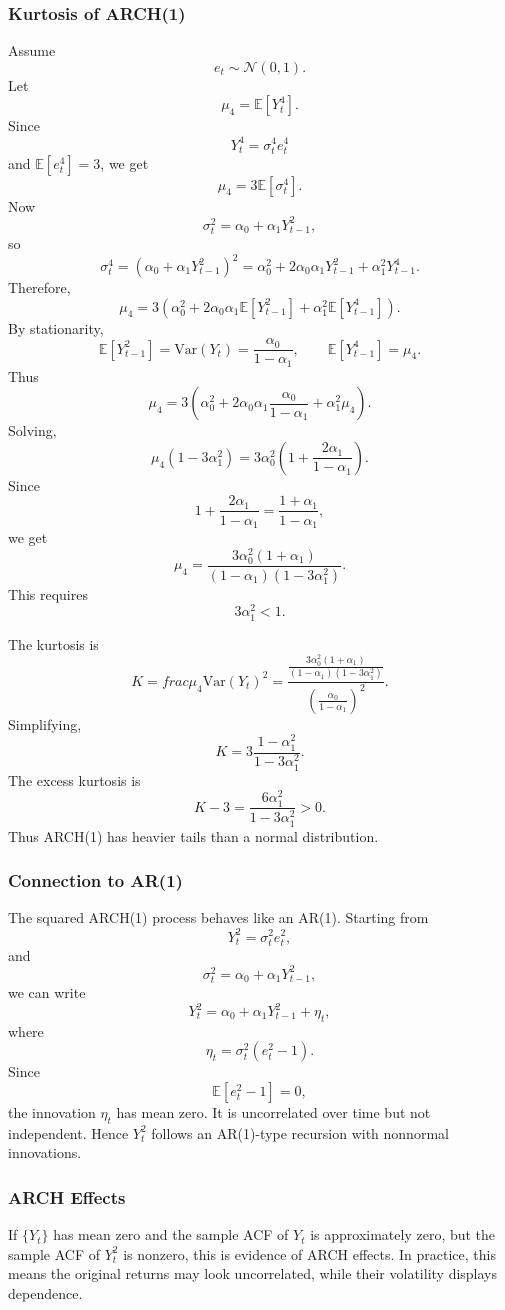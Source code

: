 \documentclass[12pt,oneside]{book}
\numberwithin{equation}{section}
\theoremstyle{definition}
\theoremstyle{plain}
\theoremstyle{remark}
\newcommand{\E}{\mathbb{E}}
\newcommand{\Var}{\mathrm{Var}}
\newcommand{\Normal}{\mathcal{N}}
\begin{document}
\subsubsection{Kurtosis of ARCH(1)}

Assume
\[
e_t\sim \Normal(0,1).
\]
Let
\[
\mu_4=\E[Y_t^4].
\]
Since
\[
Y_t^4=\sigma_t^4e_t^4
\]
and $\E[e_t^4]=3$, we get
\[
\mu_4=3\E[\sigma_t^4].
\]
Now
\[
\sigma_t^2=\alpha_0+\alpha_1Y_{t-1}^2,
\]
so
\[
\sigma_t^4
=
(\alpha_0+\alpha_1Y_{t-1}^2)^2
=
\alpha_0^2+2\alpha_0\alpha_1Y_{t-1}^2+\alpha_1^2Y_{t-1}^4.
\]
Therefore,
\[
\mu_4
=
3\left(
\alpha_0^2
+
2\alpha_0\alpha_1\E[Y_{t-1}^2]
+
\alpha_1^2\E[Y_{t-1}^4]
\right).
\]
By stationarity,
\[
\E[Y_{t-1}^2]=\Var(Y_t)=\frac{\alpha_0}{1-\alpha_1},
\qquad
\E[Y_{t-1}^4]=\mu_4.
\]
Thus
\[
\mu_4
=
3\left(
\alpha_0^2
+
2\alpha_0\alpha_1\frac{\alpha_0}{1-\alpha_1}
+
\alpha_1^2\mu_4
\right).
\]
Solving,
\[
\mu_4(1-3\alpha_1^2)
=
3\alpha_0^2
\left(
1+\frac{2\alpha_1}{1-\alpha_1}
\right).
\]
Since
\[
1+\frac{2\alpha_1}{1-\alpha_1}
=
\frac{1+\alpha_1}{1-\alpha_1},
\]
we get
\[
\mu_4
=
\frac{3\alpha_0^2(1+\alpha_1)}
{(1-\alpha_1)(1-3\alpha_1^2)}.
\]
This requires
\[
3\alpha_1^2<1.
\]

The kurtosis is
\[
K
=
frac{\mu_4}{\Var(Y_t)^2}
=
\frac{
\frac{3\alpha_0^2(1+\alpha_1)}
{(1-\alpha_1)(1-3\alpha_1^2)}
}{
\left(\frac{\alpha_0}{1-\alpha_1}\right)^2
}.
\]
Simplifying,
\[
K
=
3\frac{1-\alpha_1^2}{1-3\alpha_1^2}.
\]
The excess kurtosis is
\[
K-3
=
\frac{6\alpha_1^2}{1-3\alpha_1^2}>0.
\]
Thus ARCH(1) has heavier tails than a normal distribution.

\subsubsection{Connection to AR(1)}

The squared ARCH(1) process behaves like an AR(1). Starting from
\[
Y_t^2=\sigma_t^2e_t^2,
\]
and
\[
\sigma_t^2=\alpha_0+\alpha_1Y_{t-1}^2,
\]
we can write
\[
Y_t^2
=
\alpha_0+\alpha_1Y_{t-1}^2+\eta_t,
\]
where
\[
\eta_t
=
\sigma_t^2(e_t^2-1).
\]
Since
\[
\E[e_t^2-1]=0,
\]
the innovation $\eta_t$ has mean zero. It is uncorrelated over time but not independent. Hence $Y_t^2$ follows an AR(1)-type recursion with nonnormal innovations.

\subsubsection{ARCH Effects}

If $\{Y_t\}$ has mean zero and the sample ACF of $Y_t$ is approximately zero, but the sample ACF of $Y_t^2$ is nonzero, this is evidence of ARCH effects. In practice, this means the original returns may look uncorrelated, while their volatility displays dependence.
\end{document}

